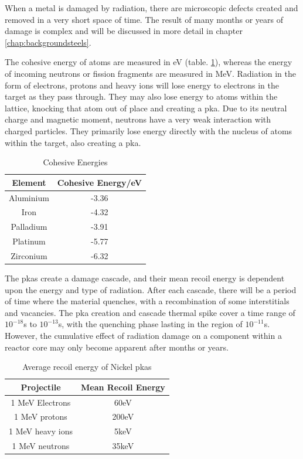 When a metal is damaged by radiation, there are microscopic defects created and removed in a very short space of time.  The result of many months or years of damage is complex and will be discussed in more detail in chapter \ref{chap:backgroundsteels}.

The cohesive energy of atoms are measured in eV (table. \ref{table:cohesiveexamples}), whereas the energy of incoming neutrons or fission fragments are measured in MeV.  Radiation in the form of electrons, protons and heavy ions will lose energy to electrons in the target as they pass through.  They may also lose energy to atoms within the lattice, knocking that atom out of place and creating a \acrshort{pka}.  Due to its neutral charge and magnetic moment, neutrons have a very weak interaction with charged particles.  They primarily lose energy directly with the nucleus of atoms within the target, also creating a \acrshort{pka}.

\begin{table}[h]
\begin{center}
\renewcommand{\arraystretch}{1.2}
\begin{tabular}{c c}
\hline\hline
Element & Cohesive Energy/eV \\
\hline\hline
Aluminium & -3.36 \\
Iron & -4.32 \\
Palladium & -3.91 \\
Platinum & -5.77 \\
Zirconium & -6.32 \\
\hline\hline
\end{tabular}
\end{center}
\caption{Cohesive Energies \cite{shengeamonline}}
\label{table:cohesiveexamples}
\end{table}

The \acrshort{pka}s create a damage cascade, and their mean recoil energy is dependent upon the energy and type of radiation.  After each cascade, there will be a period of time where the material quenches, with a recombination of some interstitials and vacancies.  The \acrshort{pka} creation and cascade thermal spike cover a time range of $10^{-18}$s to $10^{-13}$s, with the quenching phase lasting in the region of $10^{-11}$s.  However, the cumulative effect of radiation damage on a component within a reactor core may only become apparent after months or years.

\begin{table}[h]
\begin{center}
\renewcommand{\arraystretch}{1.2}
\begin{tabular}{c c}
\hline\hline
Projectile & Mean Recoil Energy \\
\hline\hline
1 MeV Electrons & 60eV \\
1 MeV protons & 200eV \\
1 MeV heavy ions & 5keV \\
1 MeV neutrons & 35keV \\
\hline\hline
\end{tabular}
\end{center}
\caption{Average recoil energy of Nickel \acrshort{pka}s\cite{gswas}}
\end{table}

